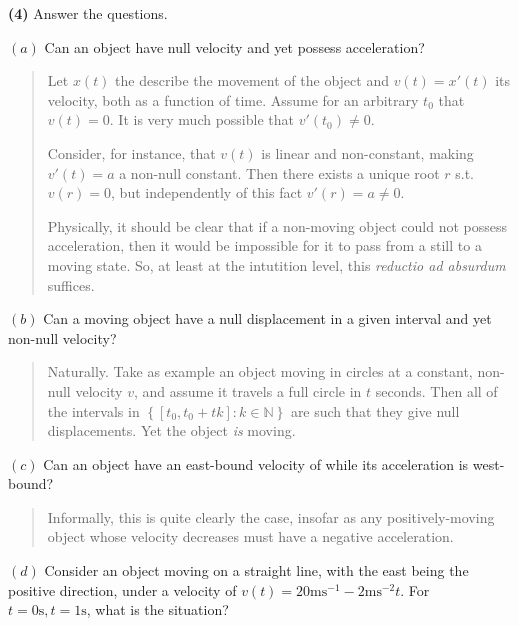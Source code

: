 \documentclass[12pt]{article}
\theoremstyle{definition}
\begin{document}
\pagebreak 

\begin{shaded}
    \textbf{(4)} Answer the questions.
\end{shaded}

$(a)$ Can an object have null velocity and yet possess acceleration?  


\small
\begin{quote}

Let $x(t)$ the describe the movement of the object and $v(t) = x'(t)$ its
velocity, both as a function of time. Assume for an arbitrary $t_0$ that 
$v(t) = 0$. It is very much possible that $v'(t_0) \neq 0$.  

Consider, for instance, that $v(t)$ is linear and non-constant, making $v'(t) =
a$ a non-null constant. Then there exists a unique root $r$ s.t. $v(r) = 0$, but
independently of this fact $v'(r) = a \neq 0$.

Physically, it should be clear that if a non-moving object could not possess
acceleration, then it would be impossible for it to pass from a still to a
moving state. So, at least at the intutition level, this \textit{reductio ad
absurdum} suffices.

\end{quote}
\normalsize

$(b)$ Can a moving object have a null displacement in a given interval and yet
non-null velocity?


\small
\begin{quote}

Naturally. Take as example an object moving in circles at a constant, non-null
velocity $v$, and assume it travels a full circle in $t$ seconds. Then all of
the intervals in $\left\{ [t_0, t_0 + tk] : k \in \mathbb{N} \right\} $ are such
that they give null displacements. Yet the object \textit{is} moving.

\end{quote}
\normalsize

$(c)$ Can an object have an east-bound velocity of while its acceleration is
west-bound?


\small
\begin{quote}

Informally, this is quite clearly the case, insofar as any positively-moving
object whose velocity decreases must have a negative acceleration.

\end{quote}
\normalsize

$(d)$ Consider an object moving on a straight line, with the east being the positive
direction, under a velocity of $v(t) = 20 \text{ms}^{-1} - 2 \text{ms}^{-2} t$.
For $t = 0\text{s}, t = 1\text{s}$, what is the situation?
\end{document}
